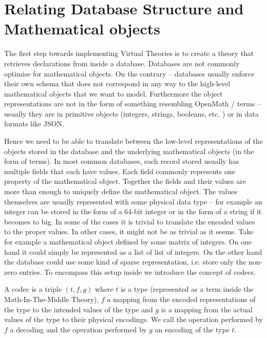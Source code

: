 \section{Relating Database Structure and Mathematical objects}\label{sec:impl}

The first step towards implementing Virtual Theories is to create a theory that retrieves
declarations from inside a database. Databases are not commonly optimise for mathematical
objects. On the contrary -- databases usually enforce their own schema that does not
correspond in any way to the high-level mathematical objects that we want to
model. Furthermore the object representations are not in the form of something resembling
OpenMath / \MMT terms -- usually they are in primitive objects (integers, strings,
booleans, etc. ) or in data formats like JSON.

Hence we need to be able to translate between the low-level representations of the objects
stored in the database and the underlying mathematical objects (in the form of \MMT terms). In
most common databases, each record stored usually has multiple fields that each have values.
Each field commonly represents one property of the mathematical object. Together the fields and
their values are more than enough to uniquely define the mathematical object. The values
themselves are usually represented with some physical data type -- for example an integer can
be stored in the form of a 64-bit integer or in the form of a string if it becomes to big. In
some of the cases it is trivial to translate the encoded values to the proper values. In other
cases, it might not be as trivial as it seems. Take for example a mathematical object defined
by some matrix of integers. On one hand it could simply be represented as a list of list of
integers. On the other hand the database could use some kind of sparse representation, i.e.
store only the non-zero entries. To encompass this setup inside \MMT we introduce the concept
of codecs.

\begin{mydef}[Codec]
  A codec is a triple $(t, f, g)$ where $t$ is a type (represented as a term inside the
  Math-In-The-Middle Theory), $f$ a mapping from the encoded representations of the type
  to the intended values of the type and $g$ is a mapping from the actual values of the
  type to their physical encodings. We call the operation performed by $f$ a decoding and
  the operation performed by $g$ an encoding of the type $t$.
\end{mydef}

